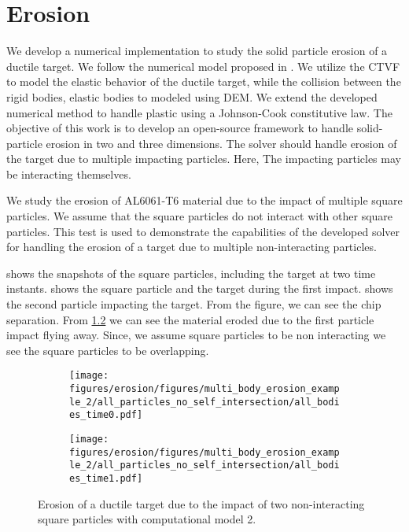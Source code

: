\chapter{Erosion}
\label{chap:erosion}
We develop a numerical implementation to study the solid particle erosion of a
ductile target. We follow the numerical model proposed in
\citep{dong2016smoothed}. We utilize the CTVF to model the elastic behavior of
the ductile target, while the collision between the rigid bodies, elastic bodies
to modeled using DEM. We extend the developed numerical method to handle plastic
using a Johnson-Cook constitutive law. The objective of this work is to develop
an open-source framework to handle solid-particle erosion in two and three
dimensions. The solver should handle erosion of the target due to multiple
impacting particles. Here, The impacting particles may be interacting
themselves.


We study the erosion of AL6061-T6 material due to the impact of multiple square
particles. We assume that the square particles do not interact with other square
particles. This test is used to demonstrate the capabilities of the developed
solver for handling the erosion of a target due to multiple non-interacting
particles.

 shows the snapshots of the square particles, including the
target at two time instants.  shows the square particle
and the target during the first impact.  shows the second
particle impacting the target. From the figure, we can see the chip separation.
From \cref{fig:mpe-2-full-b} we can see the material eroded due to the first
particle impact flying away. Since, we assume square particles to be non interacting
we see the square particles to be overlapping.
\begin{figure}[tpb]
  \centering
  \begin{subfigure}{0.48\textwidth}
    \centering
    \texttt{[image: figures/erosion/figures/multi\_body\_erosion\_example\_2/all\_particles\_no\_self\_intersection/all\_bodies\_time0.pdf]}
    \subcaption{}
    \label{fig:mpe-2-full-a}
  \end{subfigure}
  \begin{subfigure}{0.48\textwidth}
    \centering
    \texttt{[image: figures/erosion/figures/multi\_body\_erosion\_example\_2/all\_particles\_no\_self\_intersection/all\_bodies\_time1.pdf]}
    \subcaption{}
    \label{fig:mpe-2-full-b}
  \end{subfigure}
  \caption{Erosion of a ductile target due to the impact of two non-interacting
    square particles with computational model 2.}
\label{fig:mpe-2-full}
\end{figure}



